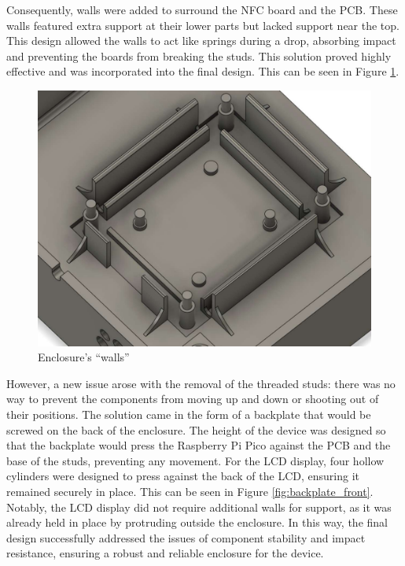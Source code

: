 Consequently, walls were added to surround the NFC board and the PCB. These walls featured extra 
support at their lower parts but lacked support near the top. This design allowed the walls to 
act like springs during a drop, absorbing impact and preventing the boards from breaking the 
studs. This solution proved highly effective and was incorporated into the final design. This 
can be seen in Figure \ref{fig:enclosure_walls}.

\begin{figure}[h]
	\centering
	\includegraphics[width = .5\textwidth]{Imagenes/Vectorial/enclosure_walls.pdf}
	\caption{Enclosure's ``walls''}
	\label{fig:enclosure_walls}
\end{figure}

However, a new issue arose with the removal of the threaded studs: there was no way to prevent the 
components from moving up and down or shooting out of their positions. The solution came in the 
form of a backplate that would be screwed on the back of the enclosure. The height of the 
device was designed so that the backplate would press the Raspberry Pi Pico against the PCB and 
the base of the studs, preventing any movement. For the LCD display, four hollow cylinders were 
designed to press against the back of the LCD, ensuring it remained securely in place. This can be 
seen in Figure \ref{fig:backplate_front}. Notably, the LCD display did not require additional 
walls for support, as it was already held in place by protruding outside the enclosure. In this 
way, the final design successfully addressed the issues of component stability and impact 
resistance, ensuring a robust and reliable enclosure for the device.

